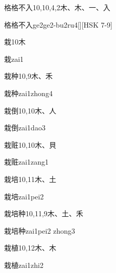 \begin{Entry}{格格不入}{10,10,4,2}{⽊、⽊、⼀、⼊}
  \begin{Phonetics}{格格不入}{ge2ge2-bu2ru4}[][HSK 7-9]
  \end{Phonetics}
\end{Entry}

\begin{Entry}{栽}{10}{⽊}
  \begin{Phonetics}{栽}{zai1}
  \end{Phonetics}
\end{Entry}

\begin{Entry}{栽种}{10,9}{⽊、⽲}
  \begin{Phonetics}{栽种}{zai1zhong4}
  \end{Phonetics}
\end{Entry}

\begin{Entry}{栽倒}{10,10}{⽊、⼈}
  \begin{Phonetics}{栽倒}{zai1dao3}
  \end{Phonetics}
\end{Entry}

\begin{Entry}{栽赃}{10,10}{⽊、⾙}
  \begin{Phonetics}{栽赃}{zai1zang1}
  \end{Phonetics}
\end{Entry}

\begin{Entry}{栽培}{10,11}{⽊、⼟}
  \begin{Phonetics}{栽培}{zai1pei2}
  \end{Phonetics}
\end{Entry}

\begin{Entry}{栽培种}{10,11,9}{⽊、⼟、⽲}
  \begin{Phonetics}{栽培种}{zai1pei2 zhong3}
  \end{Phonetics}
\end{Entry}

\begin{Entry}{栽植}{10,12}{⽊、⽊}
  \begin{Phonetics}{栽植}{zai1zhi2}
  \end{Phonetics}
\end{Entry}

